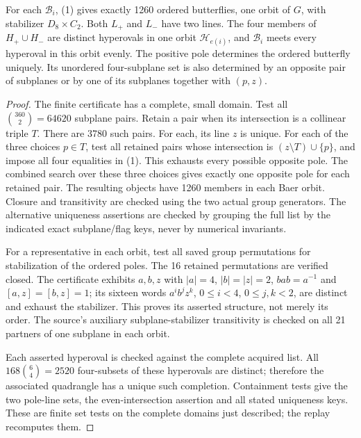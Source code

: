 \documentclass[11pt]{article}
\newcommand{\orb}{\mathcal B}\newcommand{\hyp}{\mathcal H}
\begin{document}
\begin{lemma}
For each $\orb_i$, (1) gives exactly 1260 ordered butterflies, one orbit of
$G$, with stabilizer $D_8\times C_2$. Both $L_+$ and $L_-$ have two lines.
The four members of $H_+\cup H_-$ are distinct hyperovals in one orbit
$\hyp_{e(i)}$, and $\orb_i$ meets every hyperoval in this orbit evenly.
The positive pole determines the ordered butterfly uniquely. Its unordered
four-subplane set is also determined by an opposite pair of subplanes or by
one of its subplanes together with $(p,z)$.
\end{lemma}
\begin{proof}
The finite certificate has a complete, small domain. Test all
$\binom{360}{2}=64620$ subplane pairs. Retain a pair when its intersection
is a collinear triple $T$. There are 3780 such pairs. For each, its line $z$
is unique. For each of the three choices $p\in T$, test all retained pairs
whose intersection is $(z\setminus T)\cup\{p\}$, and impose all four
equalities in (1). This exhausts every possible opposite pole. The combined search over these
three choices gives exactly one opposite pole for each retained pair. The resulting objects have 1260 members in each Baer orbit.
Closure and transitivity are checked using the two actual group generators.
The alternative uniqueness assertions are checked by grouping the full list
by the indicated exact subplane/flag keys, never by numerical invariants.

For a representative in each orbit, test all saved group permutations for
stabilization of the ordered poles. The 16 retained permutations are verified
closed. The certificate exhibits $a,b,z$ with $|a|=4$, $|b|=|z|=2$,
$bab=a^{-1}$ and $[a,z]=[b,z]=1$; its sixteen words
$a^ib^jz^k$, $0\leq i<4$, $0\leq j,k<2$, are distinct and exhaust the
stabilizer. This proves its asserted structure, not merely its order.
The source's auxiliary subplane-stabilizer transitivity is checked on all
21 partners of one subplane in each orbit.

Each asserted hyperoval is checked against the complete acquired list.
All $168\binom 64=2520$ four-subsets of these hyperovals are distinct;
therefore the associated quadrangle has a unique such completion.
Containment tests give the two pole-line sets, the even-intersection
assertion and all stated uniqueness keys. These are finite set tests on the
complete domains just described; the replay recomputes them.
\end{proof}
\end{document}
